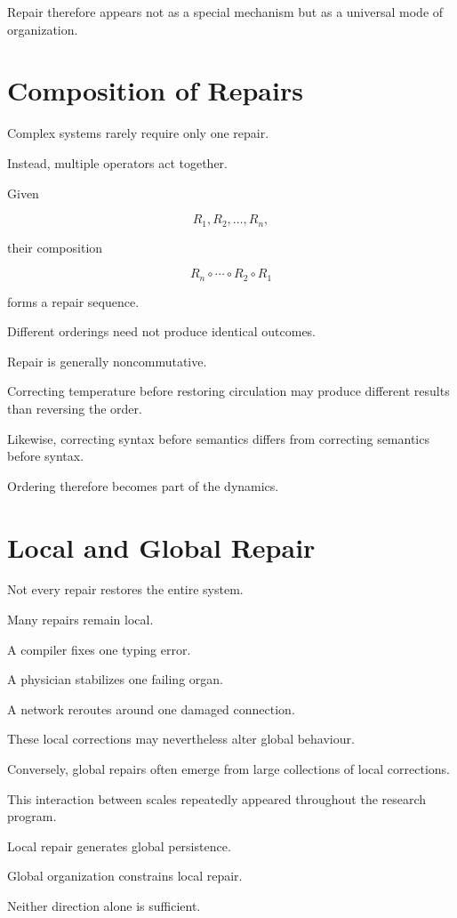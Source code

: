 \documentclass[11pt,oneside]{book}
\numberwithin{equation}{chapter}
\theoremstyle{definition}
\theoremstyle{plain}
\begin{document}
Repair therefore appears not as a special mechanism but as a universal mode
of organization.

\section{Composition of Repairs}

Complex systems rarely require only one repair.

Instead, multiple operators act together.

Given

\[
R_1,R_2,\ldots,R_n,
\]

their composition

\[
R_n
\circ
\cdots
\circ
R_2
\circ
R_1
\]

forms a repair sequence.

Different orderings need not produce identical outcomes.

Repair is generally noncommutative.

Correcting temperature before restoring circulation may produce different
results than reversing the order.

Likewise, correcting syntax before semantics differs from correcting
semantics before syntax.

Ordering therefore becomes part of the dynamics.

\section{Local and Global Repair}

Not every repair restores the entire system.

Many repairs remain local.

A compiler fixes one typing error.

A physician stabilizes one failing organ.

A network reroutes around one damaged connection.

These local corrections may nevertheless alter global behaviour.

Conversely, global repairs often emerge from large collections of local
corrections.

This interaction between scales repeatedly appeared throughout the research
program.

Local repair generates global persistence.

Global organization constrains local repair.

Neither direction alone is sufficient.
\end{document}
